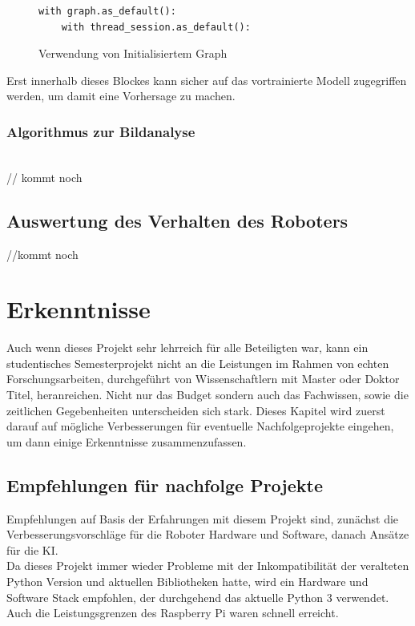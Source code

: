 \documentclass[conference]{IEEEtran}
\begin{document}
\begin{figure}
	\centering
\begin{verbatim}
with graph.as_default():
	with thread_session.as_default():
\end{verbatim}
\label{with}
\caption{Verwendung von Initialisiertem Graph}
\end{figure}


Erst innerhalb dieses Blockes kann sicher auf das vortrainierte Modell zugegriffen werden, um damit eine Vorhersage zu machen.
\subsubsection{Algorithmus zur Bildanalyse }
\noindent \\
// kommt noch 
\subsection {Auswertung des Verhalten des Roboters}	%
//kommt noch


\section{Erkenntnisse 
}
Auch wenn dieses Projekt sehr lehrreich für alle Beteiligten war, kann ein studentisches Semesterprojekt nicht an die Leistungen im Rahmen von echten Forschungsarbeiten, durchgeführt von Wissenschaftlern mit Master oder Doktor Titel, heranreichen. Nicht nur das Budget sondern auch das Fachwissen, sowie die zeitlichen Gegebenheiten unterscheiden sich stark. Dieses Kapitel wird zuerst darauf auf mögliche Verbesserungen für eventuelle Nachfolgeprojekte eingehen, um dann einige Erkenntnisse zusammenzufassen. 

\subsection{Empfehlungen für nachfolge Projekte}

Empfehlungen auf Basis der Erfahrungen mit diesem Projekt sind, zunächst die Verbesserungsvorschläge für die Roboter Hardware und Software, danach Ansätze für die KI.\\
Da dieses Projekt immer wieder Probleme mit der Inkompatibilität der veralteten Python Version und aktuellen Bibliotheken hatte, wird ein Hardware und Software Stack empfohlen, der durchgehend das aktuelle Python 3 verwendet. Auch die Leistungsgrenzen des Raspberry Pi waren schnell erreicht. \\
\end{document}
